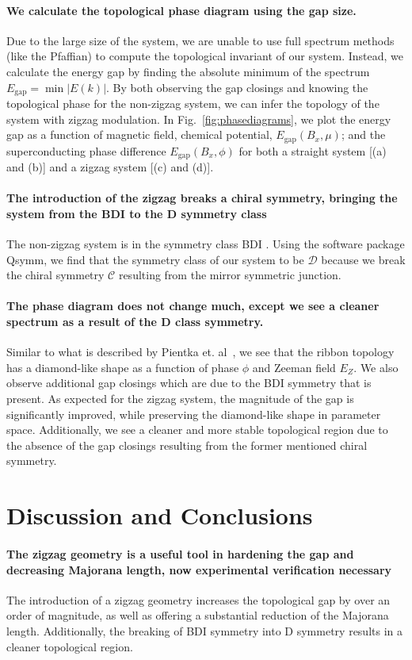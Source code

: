 \documentclass[english, twocolumn, 10pt, aps, superscriptaddress, floatfix, prb, citeautoscript]{revtex4-1}
\renewcommand{\comment}[2]{#2}
\renewcommand{\comment}{\paragraph}
\begin{document}
\comment{We calculate the topological phase diagram using the gap size.}
Due to the large size of the system, we are unable to use full spectrum methods (like the Pfaffian) to compute the topological invariant of our system.
Instead, we calculate the energy gap by finding the absolute minimum of the spectrum $E_\textrm{gap}=\min{|E(k)|}$.
By both observing the gap closings and knowing the topological phase for the non-zigzag system, we can infer the topology of the system with zigzag modulation.
In Fig.~\ref{fig:phasediagrams}, we plot the energy gap as a function of magnetic field, chemical potential, $E_\textrm{gap}(B_x, \mu)$; and the superconducting phase difference $E_\textrm{gap}(B_x, \phi)$ for both a straight system [(a) and (b)] and a zigzag system [(c) and (d)].

\comment{The introduction of the zigzag breaks a chiral symmetry, bringing the system from the BDI to the D symmetry class}
The non-zigzag system is in the symmetry class BDI \cite{pientka2017topological}.
Using the software package Qsymm\cite{varjas2018qsymm}, we find that the symmetry class of our system to be $\mathcal{D}$ because we break the chiral symmetry $\mathcal{C}$ resulting from the mirror symmetric junction.

\comment{The phase diagram does not change much, except we see a cleaner spectrum as a result of the D class symmetry.}
Similar to what is described by Pientka et. al~\cite{pientka2017topological}, we see that the ribbon topology has a diamond-like shape as a function of phase $\phi$ and Zeeman field $E_Z$.
We also observe additional gap closings which are due to the BDI symmetry that is present.
As expected for the zigzag system, the magnitude of the gap is significantly improved, while preserving the diamond-like shape in parameter space.
Additionally, we see a cleaner and more stable topological region due to the absence of the gap closings resulting from the former mentioned chiral symmetry.

\section{Discussion and Conclusions}

\comment{The zigzag geometry is a useful tool in hardening the gap and decreasing Majorana length, now experimental verification necessary}
The introduction of a zigzag geometry increases the topological gap by over an order of magnitude, as well as offering a substantial reduction of the Majorana length.
Additionally, the breaking of BDI symmetry into D symmetry results in a cleaner topological region.
\end{document}
